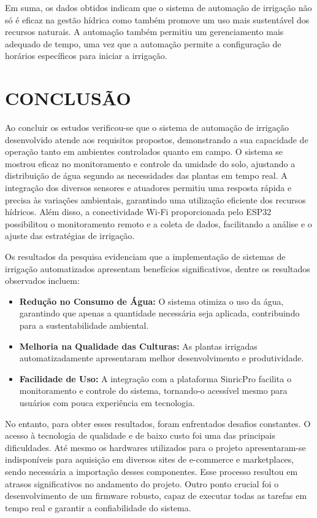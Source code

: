 \documentclass[%
  article,%
  a4paper,%
  12pt,%
  fleqn,%
  oneside,%
  chapter = TITLE,%
  section = TITLE,%
]{abntex2}
\begin{document}
Em suma, os dados obtidos indicam que o sistema de automação de irrigação não só é eficaz na gestão hídrica como também promove um uso mais sustentável dos recursos naturais. A automação também permitiu um gerenciamento mais adequado de tempo, uma vez que a automação permite a configuração de horários específicos para iniciar a irrigação.

\section{CONCLUSÃO}

Ao concluir os estudos verificou-se que o sistema de automação de irrigação desenvolvido atende aos requisitos propostos, demonstrando a sua capacidade de operação tanto em ambientes controlados quanto em campo. O sistema se mostrou eficaz no monitoramento e controle da umidade do solo, ajustando a distribuição de água segundo as necessidades das plantas em tempo real. A integração dos diversos sensores e atuadores permitiu uma resposta rápida e precisa às variações ambientais, garantindo uma utilização eficiente dos recursos hídricos. Além disso, a conectividade Wi-Fi proporcionada pelo ESP32 possibilitou o monitoramento remoto e a coleta de dados, facilitando a análise e o ajuste das estratégias de irrigação.

Os resultados da pesquisa evidenciam que a implementação de sistemas de irrigação automatizados apresentam benefícios significativos, dentre os resultados observados incluem:

\begin{itemize}
    \item \textbf{Redução no Consumo de Água:} O sistema otimiza o uso da água, garantindo que apenas a quantidade necessária seja aplicada, contribuindo para a sustentabilidade ambiental.
    \item \textbf{Melhoria na Qualidade das Culturas:} As plantas irrigadas automatizadamente apresentaram melhor desenvolvimento e produtividade.
    \item \textbf{Facilidade de Uso:} A integração com a plataforma SinricPro facilita o monitoramento e controle do sistema, tornando-o acessível mesmo para usuários com pouca experiência em tecnologia.
\end{itemize}

No entanto, para obter esses resultados, foram enfrentados desafios constantes. O acesso à tecnologia de qualidade e de baixo custo foi uma das principais dificuldades. Até mesmo os hardwares utilizados para o projeto apresentaram-se indisponíveis para aquisição em diversos sites de e-commerce e marketplaces, sendo necessária a importação desses componentes. Esse processo resultou em atrasos significativos no andamento do projeto. Outro ponto crucial foi o desenvolvimento de um firmware robusto, capaz de executar todas as tarefas em tempo real e garantir a confiabilidade do sistema.
\end{document}
